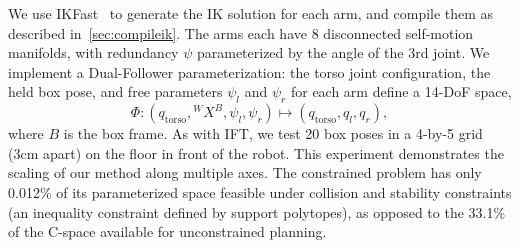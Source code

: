 \documentclass[letterpaper, 10 pt, conference]{ieeeconf}
\begin{document}

We use IKFast~\cite{ikfast} to generate the IK solution for each arm, and compile them as described in~\cref{sec:compileik}.
The arms each have 8 disconnected self-motion manifolds, with redundancy $\psi$ parameterized by the angle of the $3$rd joint.
We implement a Dual-Follower parameterization: the torso joint configuration, the held box pose, and free parameters $\psi_l$ and $\psi_r$ for each arm define a 14-DoF space,
\[
    \Phi : (q_\text{torso}, {}^{W}X^{B}, \psi_l, \psi_r) \mapsto (q_\text{torso}, q_l, q_r),
\]
where $B$ is the box frame.
As with IFT, we test 20 box poses in a 4-by-5 grid (3cm apart) on the floor in front of the robot. This experiment demonstrates the scaling of our method along multiple axes. The constrained problem has only 0.012\% of its parameterized space feasible under collision and stability constraints (an inequality constraint defined by support polytopes), as opposed to the 33.1\% of the C-space available for unconstrained planning. 


\end{document}
